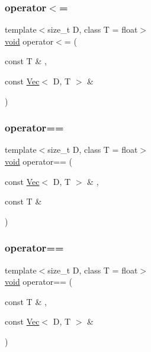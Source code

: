 \subsubsection{\texorpdfstring{operator$<$=}{operator<=}\hspace{0.1cm}{\footnotesize\ttfamily [2/2]}}
{\footnotesize\ttfamily template$<$size\+\_\+t D, class T = float$>$ \\
\hyperlink{namespacetrimesh_a784ddfd979e1c579bda795a8edfc3f43}{void} operator$<$= (\begin{DoxyParamCaption}\item[{const T \&}]{,  }\item[{const \hyperlink{classtrimesh_1_1Vec}{Vec}$<$ D, T $>$ \&}]{ }\end{DoxyParamCaption})\hspace{0.3cm}{\ttfamily [friend]}}

\mbox{\label{classtrimesh_1_1Vec_a5eca96db4999d9567b2bd0cc9848c77c}} 
\subsubsection{\texorpdfstring{operator==}{operator==}\hspace{0.1cm}{\footnotesize\ttfamily [1/2]}}
{\footnotesize\ttfamily template$<$size\+\_\+t D, class T = float$>$ \\
\hyperlink{namespacetrimesh_a784ddfd979e1c579bda795a8edfc3f43}{void} operator== (\begin{DoxyParamCaption}\item[{const \hyperlink{classtrimesh_1_1Vec}{Vec}$<$ D, T $>$ \&}]{,  }\item[{const T \&}]{ }\end{DoxyParamCaption})\hspace{0.3cm}{\ttfamily [friend]}}

\mbox{\label{classtrimesh_1_1Vec_aa5a538a9fb73946af34ad539d9c89afc}} 
\subsubsection{\texorpdfstring{operator==}{operator==}\hspace{0.1cm}{\footnotesize\ttfamily [2/2]}}
{\footnotesize\ttfamily template$<$size\+\_\+t D, class T = float$>$ \\
\hyperlink{namespacetrimesh_a784ddfd979e1c579bda795a8edfc3f43}{void} operator== (\begin{DoxyParamCaption}\item[{const T \&}]{,  }\item[{const \hyperlink{classtrimesh_1_1Vec}{Vec}$<$ D, T $>$ \&}]{ }\end{DoxyParamCaption})\hspace{0.3cm}{\ttfamily [friend]}}

